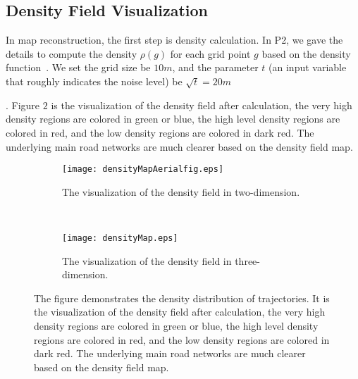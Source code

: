 \documentclass[11pt]{article}
\begin{document}
\subsection*{Density Field Visualization}
In map reconstruction, the first step is density calculation.  In P2,  we gave the details to compute the density $\rho(g)$ for each grid point $g$ based on the density function~\cite{Wang15}. We set the grid size be $10m$, and the parameter $t$ (an input variable that roughly indicates the noise level) be $\sqrt{t}=20 m$ \begin{comment} we should not include this unless we can say how we know what to approximate the noise as!!!!!!!!\end{comment}. Figure $2$ is the visualization of the density field after calculation, the very high density regions are colored in green or blue, the high level density regions are colored in red, and the low density regions are colored in dark red. The underlying main road networks are much clearer based on the density field map. 

\begin{figure*}[t!]
    \centering
    \begin{subfigure}[t]{0.5\textwidth}
        \centering
        \texttt{[image: densityMapAerialfig.eps]}
        \caption{The visualization of the density field in two-dimension.}
    \end{subfigure}%
    ~
    \begin{subfigure}[t]{0.5\textwidth}
        \centering
        \texttt{[image: densityMap.eps]}
        \caption{The visualization of the density field in three-dimension.}
    \end{subfigure}
    \caption{The figure demonstrates the density distribution of trajectories. It is the visualization of the density field after calculation, the very high density regions are colored in green or blue, the high level density regions are colored in red, and the low density regions are colored in dark red. The underlying main road networks are much clearer based on the density field map.}
\end{figure*}
\end{document}
